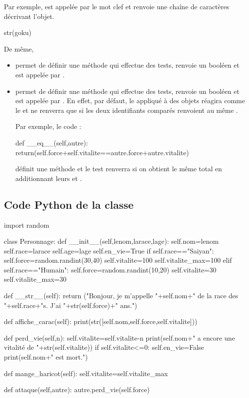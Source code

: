\documentclass[11pt,a4paper,french,twoside]{PMCours}
\begin{document}
\begin{enumerate}
Par exemple,  est appelée par le mot clef  et renvoie 
une chaîne de caractères décrivant l'objet.

\begin{Python}
str(goku)
\end{Python}

De même,
\begin{itemize} 
\item {} permet de définir une méthode qui effectue des tests, 
renvoie un booléen et est appelée par \code{<}.
\item {} permet de définir une méthode qui effectue des tests, 
renvoie un booléen et est appelée par \code{==}. En effet, par défaut, le \code{==}  
appliqué à des objets réagira comme le  et ne renverra  que si 
les deux identifiants comparés renvoient au même .

Par exemple, le code :
\begin{Python}
    def __eq__(self,autre):
        return(self.force+self.vitalite==autre.force+autre.vitalite)
\end{Python}

définit une méthode et le test  renverra  si 
on obtient le même total en additionnant leurs  et . 
\end{itemize}
\end{enumerate}


\subsection*{Code Python de la classe}
\begin{Python}
import random

class Personnage:
    def __init__(self,lenom,larace,lage):
        self.nom=lenom
        self.race=larace
        self.age=lage
        self.en_vie=True
        if self.race=="Saiyan":
            self.force=random.randint(30,40)
            self.vitalite=100
            self.vitalite_max=100
        elif self.race=="Humain":
            self.force=random.randint(10,20)
            self.vitalite=30
            self.vitalite_max=30
        
    def __str__(self):
            return ("Bonjour, je m'appelle "+self.nom+" de la race des "+self.race+"s\n. J'ai "+str(self.force)+" ans.")
        
    def affiche_carac(self):
            print(str([self.nom,self.force,self.vitalite]))  

    def perd_vie(self,n):
        self.vitalite=self.vitalite-n
        print(self.nom+" a encore une vitalité de "+str(self.vitalite))
        if self.vitalite<=0:
            self.en_vie=False
            print(self.nom+" est mort.")
        
    def mange_haricot(self):
        self.vitalite=self.vitalite_max
        
    def attaque(self,autre):
        autre.perd_vie(self.force)
\end{Python}
\end{document}
